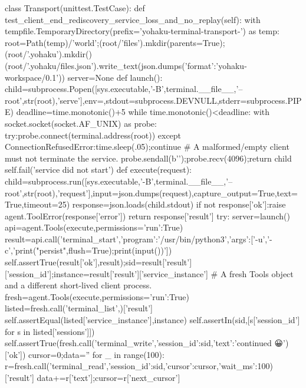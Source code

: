 class Transport(unittest.TestCase):
    def test_client_end_rediscovery_service_loss_and_no_replay(self):
        with tempfile.TemporaryDirectory(prefix='yohaku-terminal-transport-') as temp:
            root=Path(temp)/'world';(root/'files').mkdir(parents=True);(root/'.yohaku').mkdir()
            (root/'.yohaku/files.json').write_text(json.dumps({'format':'yohaku-workspace/0.1'}))
            server=None
            def launch():
                child=subprocess.Popen([sys.executable,'-B',terminal.__file__,'--root',str(root),'serve'],env={},stdout=subprocess.DEVNULL,stderr=subprocess.PIPE)
                deadline=time.monotonic()+5
                while time.monotonic()<deadline:
                    with socket.socket(socket.AF_UNIX) as probe:
                        try:probe.connect(terminal.address(root))
                        except ConnectionRefusedError:time.sleep(.05);continue
                        # A malformed/empty client must not terminate the service.
                        probe.sendall(b'{}\n');probe.recv(4096);return child
                self.fail('service did not start')
            def execute(request):
                child=subprocess.run([sys.executable,'-B',terminal.__file__,'--root',str(root),'request'],input=json.dumps(request),capture_output=True,text=True,timeout=25)
                response=json.loads(child.stdout)
                if not response['ok']:raise agent.ToolError(response['error'])
                return response['result']
            try:
                server=launch()
                api=agent.Tools(execute,permissions={'run':True})
                result=api.call('terminal_start',{'program':'/usr/bin/python3','args':['-u','-c','print("persist",flush=True);print(input())']})
                self.assertTrue(result['ok'],result);sid=result['result']['session_id'];instance=result['result']['service_instance']
                # A fresh Tools object and a different short-lived client process.
                fresh=agent.Tools(execute,permissions={'run':True})
                listed=fresh.call('terminal_list',{})['result']
                self.assertEqual(listed['service_instance'],instance)
                self.assertIn(sid,[s['session_id'] for s in listed['sessions']])
                self.assertTrue(fresh.call('terminal_write',{'session_id':sid,'text':'continued 😀\n'})['ok'])
                cursor=0;data=''
                for _ in range(100):
                    r=fresh.call('terminal_read',{'session_id':sid,'cursor':cursor,'wait_ms':100})['result']
                    data+=r['text'];cursor=r['next_cursor']
